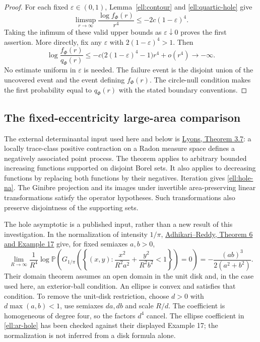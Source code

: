 \documentclass[11pt,a4paper]{article}
\theoremstyle{definition}
\theoremstyle{remark}
\numberwithin{equation}{section}
\begin{document}
\begin{proof}
For each fixed $\varepsilon\in(0,1)$,
Lemma~\ref{ell:contour} and \eqref{ell:quartic-hole} give
\[
 \limsup_{r\to\infty}\frac{\log f_\Phi(r)}{r^4}
 \le-2c(1-\varepsilon)^4.
\]
Taking the infimum of these valid upper bounds as
$\varepsilon\downarrow0$ proves the first assertion.  More directly,
fix any $\varepsilon$ with $2(1-\varepsilon)^4>1$.  Then
\[
 \log\frac{f_\Phi(r)}{q_\Phi(r)}
 \le -c\bigl(2(1-\varepsilon)^4-1\bigr)r^4+o(r^4)
 \longrightarrow-\infty.
\]
No estimate uniform in $\varepsilon$ is needed.  The failure event
is the disjoint union of the uncovered event and the event defining
$f_\Phi(r)$.  The circle-null condition makes the first probability
equal to $q_\Phi(r)$ with the stated boundary conventions.
\end{proof}

\subsection{The fixed-eccentricity large-area comparison}

The external determinantal input used here and below is
\href{https://arxiv.org/html/1406.2707v1}{Lyons, Theorem 3.7}:
a locally trace-class positive contraction on a Radon measure space
defines a negatively associated point process.  The theorem applies
to arbitrary bounded increasing functions supported on disjoint
Borel sets.  It also applies to decreasing functions by replacing
both functions by their negatives.  Iteration gives
\eqref{ell:hole-na}.  The Ginibre projection and its images under
invertible area-preserving linear transformations satisfy the
operator hypotheses.  Such transformations also preserve
disjointness of the supporting sets.

The hole asymptotic is a published input, rather than a new result
of this investigation.  In the normalization of intensity $1/\pi$,
\href{https://arxiv.org/html/1604.08363v3}{Adhikari--Reddy,
Theorem 6 and Example 17} give, for fixed semiaxes $a,b>0$,
\begin{equation}\label{ell:ar-hole}
 \lim_{R\to\infty}\frac1{R^4}
 \log\mathbb P\left(G_{1/\pi}\left(
 \left\{(x,y):\frac{x^2}{R^2a^2}+\frac{y^2}{R^2b^2}<1\right\}
 \right)=0\right)
 =-\frac{(ab)^3}{2(a^2+b^2)}.
\end{equation}
Their domain theorem assumes an open domain in the unit disk and,
in the case used here, an exterior-ball condition.  An ellipse is
convex and satisfies that condition.  To remove the unit-disk
restriction, choose $d>0$ with $d\max(a,b)<1$, use semiaxes
$da,db$ and scale $R/d$.  The coefficient is homogeneous of
degree four, so the factors $d^4$ cancel.  The ellipse coefficient
in \eqref{ell:ar-hole} has been checked against their displayed
Example 17; the normalization is not inferred from a disk formula
alone.
\end{document}
